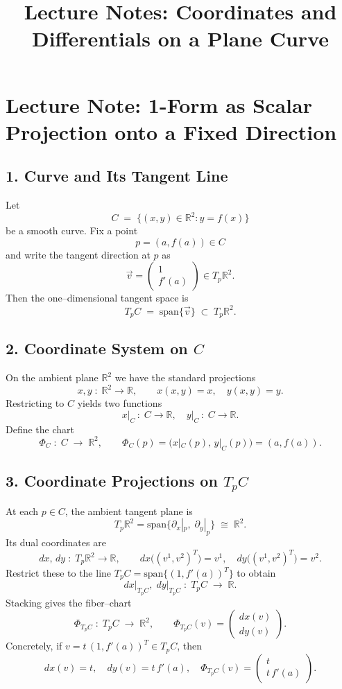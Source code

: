 \documentclass[12pt]{article}
\title{Lecture Notes: Coordinates and Differentials on a Plane Curve}
\author{}
\date{}
\theoremstyle{definitionstyle}
\newcommand{\R}{\mathbb{R}}
\renewcommand{\span}{\text{span}}
\begin{document}
\maketitle
\section*{Lecture Note: 1-Form as Scalar Projection onto a Fixed Direction}

\subsection*{1. Curve and Its Tangent Line}
Let 
\[
C \;=\;\bigl\{(x,y)\in\R^2\colon y=f(x)\bigr\}
\]
be a smooth curve.  Fix a point 
\[
p=(a,f(a))\in C
\]
and write the tangent direction at \(p\) as
\[
\vec v
=\begin{pmatrix}1\\ f'(a)\end{pmatrix}\in T_p\R^2.
\]
Then the one–dimensional tangent space is
\[
T_pC \;=\;\span\{\vec v\}
\;\subset\;T_p\R^2.
\]

\subsection*{2. Coordinate System on \(C\)}
On the ambient plane \(\R^2\) we have the standard projections
\[
x,y\;:\;\R^2\longrightarrow\R,
\qquad
x(x,y)=x,
\quad
y(x,y)=y.
\]
Restricting to \(C\) yields two functions
\[
x\big|_C\,:\;C\to\R,
\quad
y\big|_C\,:\;C\to\R.
\]
Define the chart
\[
\Phi_C\;:\;C\;\longrightarrow\;\R^2,
\qquad
\Phi_C(p)=\bigl(x|_C(p),\,y|_C(p)\bigr)=(a,f(a)).
\]

\subsection*{3. Coordinate Projections on \(T_pC\)}
At each \(p\in C\), the ambient tangent plane is
\[
T_p\R^2
=\span\bigl\{\partial_x|_p,\;\partial_y|_p\bigr\}
\;\cong\;\R^2.
\]
Its dual coordinates are
\[
dx,\,dy\;:\;T_p\R^2\to\R,
\qquad
dx\bigl((v^1,v^2)^T\bigr)=v^1,
\quad
dy\bigl((v^1,v^2)^T\bigr)=v^2.
\]
Restrict these to the line \(T_pC=\span\{(1,f'(a))^T\}\) to obtain
\[
dx\big|_{T_pC},\;dy\big|_{T_pC}
\;:\;
T_pC\;\longrightarrow\;\R.
\]
Stacking gives the fiber–chart
\[
\Phi_{T_pC}\;:\;T_pC\;\longrightarrow\;\R^2,
\qquad
\Phi_{T_pC}(v)
=\begin{pmatrix}
	dx(v)\\[4pt]
	dy(v)
\end{pmatrix}.
\]
Concretely, if \(v=t\,(1,f'(a))^T\in T_pC\), then
\[
dx(v)=t,
\quad
dy(v)=t\,f'(a),
\quad
\Phi_{T_pC}(v)
=\begin{pmatrix}t\\[3pt]t\,f'(a)\end{pmatrix}.
\]
\end{document}
